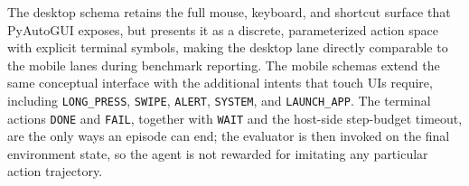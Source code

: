 The desktop schema retains the full mouse, keyboard, and shortcut surface that PyAutoGUI exposes, but presents it as a discrete, parameterized action space with explicit terminal symbols, making the desktop lane directly comparable to the mobile lanes during benchmark reporting. The mobile schemas extend the same conceptual interface with the additional intents that touch UIs require, including \texttt{LONG\_PRESS}, \texttt{SWIPE}, \texttt{ALERT}, \texttt{SYSTEM}, and \texttt{LAUNCH\_APP}.
The terminal actions \texttt{DONE} and \texttt{FAIL}, together with \texttt{WAIT} and the host-side step-budget timeout, are the only ways an episode can end; the evaluator is then invoked on the final environment state, so the agent is not rewarded for imitating any particular action trajectory.

